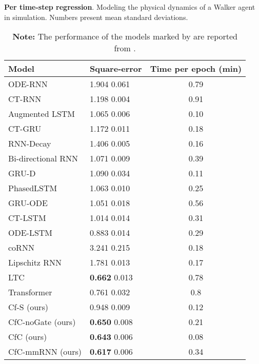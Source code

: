 \documentclass[12pt]{article}
\begin{document}
\begin{table}[t]
    \centering
     \caption{\textbf{Per time-step regression}. Modeling the physical dynamics of a Walker agent in simulation. Numbers present mean  standard deviations. }
     \begin{tabular}{llc}
     \toprule
     Model & Square-error & Time per epoch (min) \\
\hline
ODE-RNN \cite{rubanova2019latent} & 1.904  0.061 & 0.79 \\
CT-RNN \cite{funahashi1993approximation} & 1.198  0.004 & 0.91\\
Augmented LSTM \cite{hochreiter1997long} & 1.065  0.006 & 0.10 \\
CT-GRU \cite{mozer2017discrete} & 1.172  0.011  & 0.18 \\
RNN-Decay \cite{rubanova2019latent} & 1.406  0.005 & 0.16\\
Bi-directional RNN \cite{schuster1997bidirectional} & 1.071  0.009 & 0.39 \\
GRU-D \cite{che2018recurrent}& 1.090  0.034 & 0.11 \\
PhasedLSTM \cite{neil2016phased} & 1.063  0.010 & 0.25 \\
GRU-ODE \cite{rubanova2019latent} & 1.051  0.018 & 0.56 \\
CT-LSTM \cite{mei2017neural} & 1.014  0.014 & 0.31 \\
ODE-LSTM \cite{lechner2020learning} & 0.883  0.014 & 0.29 \\
coRNN \cite{rusch2021coupled} & 3.241  0.215 & 0.18 \\
Lipschitz RNN \cite{erichson2021lipschitz} & 1.781  0.013 & 0.17 \\
LTC \cite{hasani2021liquid} & \textbf{0.662}  0.013 & 0.78 \\
Transformer \cite{vaswani2017attention} & 0.761  0.032 & 0.8 \\
     \cmidrule{1-3}
     Cf-S (ours) & 0.948   0.009 & 0.12 \\
     CfC-noGate (ours) & \textbf{0.650}   0.008 & 0.21 \\
     CfC (ours) & \textbf{0.643}  0.006 & 0.08 \\
     CfC-mmRNN (ours) & \textbf{0.617}  0.006 & 0.34\\
     \bottomrule
     \end{tabular}
    \caption*{\footnotesize \textbf{Note:} The performance of the models marked by  are reported from \cite{lechner2020learning}.}
 \label{tab:real_walker}
\end{table}
\end{document}
